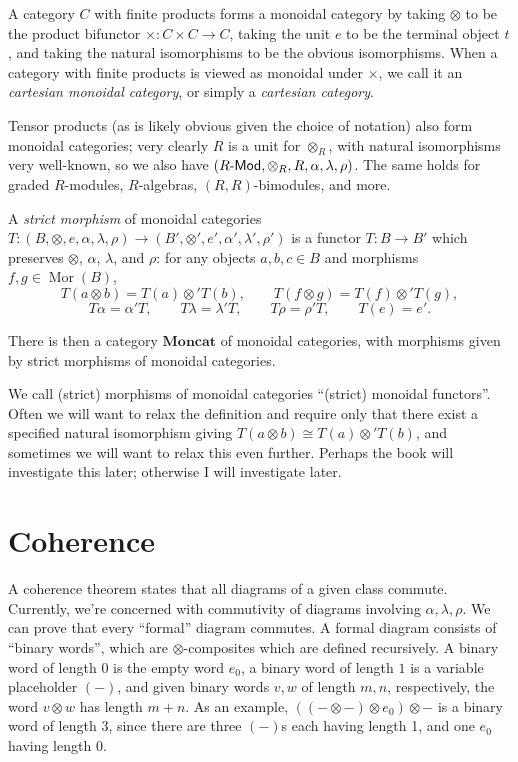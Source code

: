 A category $C$ with finite products forms a monoidal category by taking $\otimes $ to be the product bifunctor $\times : C\times C \to C$, taking the unit $e$ to be the terminal object $t$, and taking the natural isomorphisms to be the obvious isomorphisms. When a category with finite products is viewed as monoidal under $\times $, we call it an \emph{cartesian monoidal category}, or simply a \emph{cartesian category}.

Tensor products (as is likely obvious given the choice of notation) also form monoidal categories; very clearly $R$ is a unit for $\otimes _R$, with natural isomorphisms very well-known, so we also have $(R\text{-}\mathsf{Mod} ,\otimes _R,R,\alpha,\lambda,\rho)$. The same holds for graded $R$-modules, $R$-algebras, $(R,R)$-bimodules, and more.

\begin{definition}\label{dfn:7.2}
	A \emph{strict morphism} of monoidal categories $T : (B,\otimes ,e,\alpha,\lambda,\rho) \to (B',\otimes ',e',\alpha',\lambda',\rho')$ is a functor $T : B \to B'$ which preserves $\otimes $, $\alpha$, $\lambda$, and $\rho$: for any objects $a,b,c\in B$ and morphisms $f,g\in \operatorname{Mor} (B)$,
	\[
		T(a\otimes b)=T(a)\otimes 'T(b),\qquad T(f\otimes g)=T(f)\otimes 'T(g),
	\]
	\[
		T\alpha = \alpha'T,\qquad T\lambda = \lambda'T,\qquad T\rho = \rho'T,\qquad T(e)=e'
	.\]
\end{definition}
There is then a category $\mathbf{Moncat} $ of monoidal categories, with morphisms given by strict morphisms of monoidal categories.

We call (strict) morphisms of monoidal categories ``(strict) monoidal functors''. Often we will want to relax the definition and require only that there exist a specified natural isomorphism giving $T(a\otimes b)\cong T(a)\otimes 'T(b)$, and sometimes we will want to relax this even further. Perhaps the book will investigate this later; otherwise I will investigate later.

\section{Coherence}

A coherence theorem states that all diagrams of a given class commute. Currently, we're concerned with commutivity of diagrams involving $\alpha,\lambda,\rho$. We can prove that every ``formal'' diagram commutes. A formal diagram consists of ``binary words'', which are $\otimes $-composites which are defined recursively. A binary word of length $0$ is the empty word $e_0$, a binary word of length $1$ is a variable placeholder $(-)$, and given binary words $v,w$ of length $m,n$, respectively, the word $v\otimes w$ has length $m+n$. As an example, $((-\otimes -)\otimes e_0)\otimes -$ is a binary word of length 3, since there are three $(-)$s each having length 1, and one $e_0$ having length 0.

